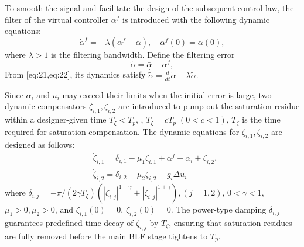 \documentclass[pdflatex,sn-mathphys-num]{sn-jnl}%
\theoremstyle{thmstyleone}%
\theoremstyle{thmstyletwo}%
\theoremstyle{thmstylethree}%
\begin{document}
 To smooth the signal and facilitate the design of the subsequent control law, the filter of the virtual controller $\alpha^{f}$ is introduced with the following dynamic equations:
\begin{equation}\label{eq:22}
	\dot{\alpha}^{f}
	= -\lambda\left(\alpha^{f}-\bar{\alpha}\right),
	\quad
	\alpha^{f}(0)=\bar{\alpha}(0),
\end{equation}
where $\lambda>1$ is the filtering bandwidth. Define the filtering error 
\begin{equation}\label{eq:23}
	\tilde{\alpha}= \bar{\alpha}-\alpha^{f},
\end{equation}
From \cref{eq:21,eq:22}, its dynamics satisfy
\(
\dot{\tilde{\alpha}}= \frac{d}{dt}\dot{\alpha}-\lambda{\tilde{\alpha}}.
\)


Since \(\alpha_i\) and \(u_i\) may exceed their
limits when the initial error is large, two dynamic compensators
\(\zeta_{i,1},\zeta_{i,2}\) are introduced to pump out the
saturation residue within a designer-given time $T_{\zeta}< T_{p}$, , $T_{\zeta}=c T_{p}\;(0<c <1)$, $T_{\zeta}$ is the time required for saturation compensation. The dynamic equations for \(\zeta_{i,1},\zeta_{i,2}\) are designed as follows:
\begin{subequations}\label{eq:24}
	\begin{align}
		& \dot\zeta_{i,1}\!
	  = \delta_{i,1}-\mu_1 \zeta_{i,1}
		 + \alpha^{f}-\alpha_i+\zeta_{i,2}, \\
	  &\dot\zeta_{i,2}\!=\delta_{i,2}-\mu_2 \zeta_{i,2}- {g_i}{\Delta u_i}
	\end{align}
	\end{subequations}
where $\delta_{i,j} =-{\pi}/({2\gamma T_{\zeta}})(|\zeta_{i,j}|^{1-\gamma}
+|\zeta_{i,j}|^{1+\gamma}), (j=1,2)$, \(0<\gamma<1\), $\mu_1>0, \mu_2>0$, and $\zeta_{i,1}(0)=0$, $\zeta_{i,2}(0)=0$. The power-type damping $\delta_{i,j}$ guarantees predefined-time decay of $\zeta_{i,j}$ by $T_{\zeta}$, ensuring that saturation residues are fully removed before the main BLF stage tightens to $T_p$.
\end{document}
